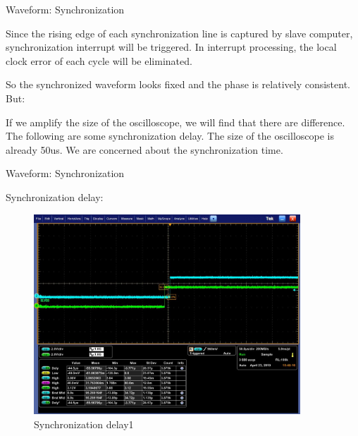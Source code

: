 \begin{frame}[fragile]{Waveform: Synchronization}

Since the rising edge of each synchronization line is captured by slave computer, synchronization interrupt will be triggered. In interrupt processing, the local clock error of each cycle will be eliminated.


So the synchronized waveform looks fixed  and the phase is relatively consistent. But:

If we amplify the size of the oscilloscope, we will find that there are difference. The following are some synchronization delay. The size of the oscilloscope is already 50us. We are concerned about the synchronization time.


\end{frame}



\begin{frame}[fragile]{Waveform: Synchronization}

Synchronization delay:

  \begin{figure}[htbp]
  \begin{center}
  \includegraphics[width=10cm]{img/mis1}
  \caption{Synchronization delay1}
  \label{report}
  \end{center}
  \vspace{-0.5em}
  \end{figure}


\end{frame}


